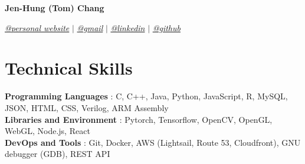 \documentclass[letterpaper,11pt]{article}
\newcommand{\namespace}{
\vspace{3pt}
}
\newcommand{\sectionspace}{
\vspace{-20pt}
}
\newcommand{\subheadingtitlevspace}{
\vspace{-3pt}
}
\newcommand{\titleItem}[1]{
  \textbf{#1}
}
\begin{document}
\begin{center}
    \textbf{\huge{\center Jen-Hung (Tom) Chang }} \\
    \namespace
    \href{https://d3h8gbhbp2l0t0.cloudfront.net}{{\textit{@personal website}}} $|$
    \href{mailto:tom.jenhungchang@gmail.com}{{\textit{@gmail}}} $|$ 
    \href{https://linkedin.com/in/JenhungChang}{{\textit{@linkedin}}} $|$
    \href{https://github.com/tom89622}{{\textit{@github}}}
    \vspace{-8pt}
\end{center}



    

\section{Technical Skills}
\subheadingtitlevspace
  \begin{itemize}[leftmargin=0.15in, label={}]
    {\item{
      \titleItem{Programming Languages}{: C, C++, Java, Python, JavaScript, R, MySQL, JSON, HTML, CSS, Verilog, ARM Assembly} \\
      \titleItem{Libraries and Environment}{: Pytorch, Tensorflow, OpenCV, OpenGL, WebGL, Node.js, React} \\
      \titleItem{DevOps and Tools}{: Git, Docker, AWS (Lightsail, Route 53, Cloudfront), GNU debugger (GDB), REST API} \\
    }}
  \end{itemize}
\sectionspace
\end{document}
